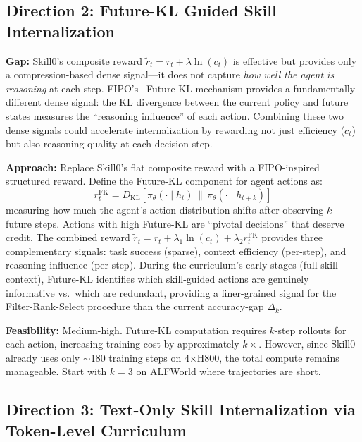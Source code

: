 \documentclass[11pt]{article}
\begin{document}
\subsection{Direction 2: Future-KL Guided Skill Internalization}

\textbf{Gap:} Skill0's composite reward $\tilde{r}_t = r_t + \lambda \ln(c_t)$ is effective but provides only a compression-based dense signal---it does not capture \textit{how well the agent is reasoning} at each step. FIPO's~\cite{fipo} Future-KL mechanism provides a fundamentally different dense signal: the KL divergence between the current policy and future states measures the ``reasoning influence'' of each action. Combining these two dense signals could accelerate internalization by rewarding not just efficiency ($c_t$) but also reasoning quality at each decision step.

\textbf{Approach:} Replace Skill0's flat composite reward with a FIPO-inspired structured reward. Define the Future-KL component for agent actions as:
\begin{equation}
    r_t^{\mathrm{FK}} = D_{\mathrm{KL}}\!\left[\pi_\theta(\cdot \mid h_t) \,\|\, \pi_\theta(\cdot \mid h_{t+k})\right]
\end{equation}
measuring how much the agent's action distribution shifts after observing $k$ future steps. Actions with high Future-KL are ``pivotal decisions'' that deserve credit. The combined reward $\tilde{r}_t = r_t + \lambda_1 \ln(c_t) + \lambda_2 r_t^{\mathrm{FK}}$ provides three complementary signals: task success (sparse), context efficiency (per-step), and reasoning influence (per-step). During the curriculum's early stages (full skill context), Future-KL identifies which skill-guided actions are genuinely informative vs.\ which are redundant, providing a finer-grained signal for the Filter-Rank-Select procedure than the current accuracy-gap $\Delta_k$.

\textbf{Feasibility:} Medium-high. Future-KL computation requires $k$-step rollouts for each action, increasing training cost by approximately $k\times$. However, since Skill0 already uses only $\sim$180 training steps on 4$\times$H800, the total compute remains manageable. Start with $k=3$ on ALFWorld where trajectories are short.

\subsection{Direction 3: Text-Only Skill Internalization via Token-Level Curriculum}
\end{document}
